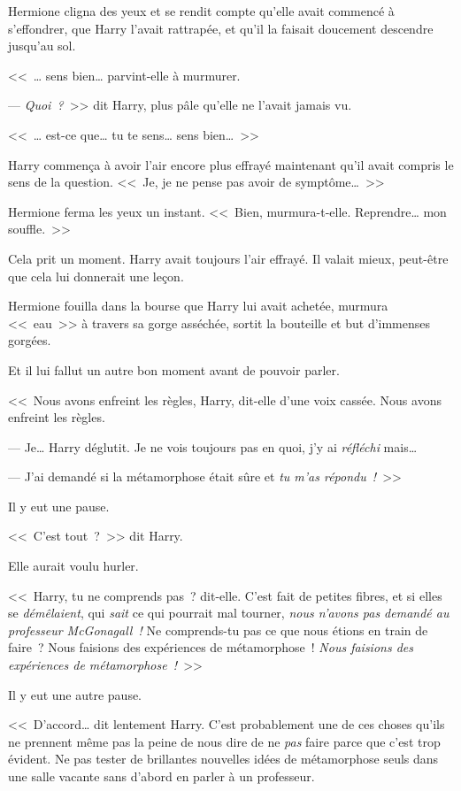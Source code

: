 Hermione cligna des yeux et se rendit compte qu'elle avait commencé à s'effondrer, que Harry l'avait rattrapée, et qu'il la faisait doucement descendre jusqu'au sol.

<<~… sens bien… parvint-elle à murmurer.

--- \emph{Quoi~?}~>> dit Harry, plus pâle qu'elle ne l'avait jamais vu.

<<~… est-ce que… tu te sens… sens bien…~>>

Harry commença à avoir l'air encore plus effrayé maintenant qu'il avait compris le sens de la question. <<~Je, je ne pense pas avoir de symptôme…~>>

Hermione ferma les yeux un instant. <<~Bien, murmura-t-elle. Reprendre… mon souffle.~>>

Cela prit un moment. Harry avait toujours l'air effrayé. Il valait mieux, peut-être que cela lui donnerait une leçon.

Hermione fouilla dans la bourse que Harry lui avait achetée, murmura <<~eau~>> à travers sa gorge asséchée, sortit la bouteille et but d'immenses gorgées.

Et il lui fallut un autre bon moment avant de pouvoir parler.

<<~Nous avons enfreint les règles, Harry, dit-elle d'une voix cassée. Nous avons enfreint les règles.

--- Je… Harry déglutit. Je ne vois toujours pas en quoi, j'y ai \emph{réfléchi} mais…

--- J'ai demandé si la métamorphose était sûre et \emph{tu m'as répondu~!}~>>

Il y eut une pause.

<<~C'est tout~?~>> dit Harry.

Elle aurait voulu hurler.

<<~Harry, tu ne comprends pas~? dit-elle. C'est fait de petites fibres, et si elles se \emph{démêlaient}, qui \emph{sait} ce qui pourrait mal tourner, \emph{nous n'avons pas demandé au professeur McGonagall~!} Ne comprends-tu pas ce que nous étions en train de faire~? Nous faisions des expériences de métamorphose~! \emph{Nous faisions des expériences de métamorphose~!}~>>

Il y eut une autre pause.

<<~D'accord… dit lentement Harry. C'est probablement une de ces choses qu'ils ne prennent même pas la peine de nous dire de ne \emph{pas} faire parce que c'est trop évident. Ne pas tester de brillantes nouvelles idées de métamorphose seuls dans une salle vacante sans d'abord en parler à un professeur.

